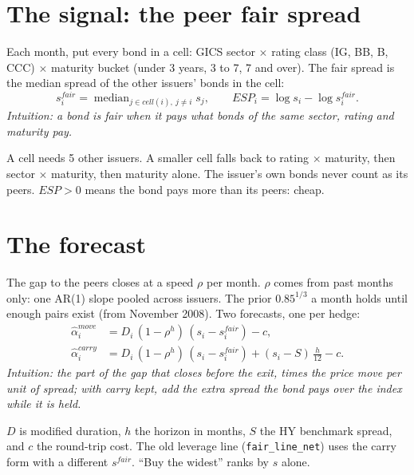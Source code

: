 \documentclass[11pt,a4paper]{article}
\newcommand{\code}[1]{\texttt{\small #1}}
\begin{document}
\section{The signal: the peer fair spread}
Each month, put every bond in a cell: GICS sector $\times$ rating class (IG, BB, B, CCC) $\times$ maturity bucket (under 3 years, 3 to 7, 7 and over). The fair spread is the median spread of the other issuers' bonds in the cell:
\begin{equation}
s^{fair}_i = \operatorname{median}_{j \in cell(i),\ j \ne i} s_j, \qquad ESP_i = \log s_i - \log s^{fair}_i .
\end{equation}
\textit{Intuition: a bond is fair when it pays what bonds of the same sector, rating and maturity pay.}

A cell needs 5 other issuers. A smaller cell falls back to rating $\times$ maturity, then sector $\times$ maturity, then maturity alone. The issuer's own bonds never count as its peers. $ESP > 0$ means the bond pays more than its peers: cheap.

\section{The forecast}
The gap to the peers closes at a speed $\rho$ per month. $\rho$ comes from past months only: one AR(1) slope pooled across issuers. The prior $0.85^{1/3}$ a month holds until enough pairs exist (from November 2008). Two forecasts, one per hedge:
\begin{align}
\hat\alpha^{move}_i &= D_i\,(1-\rho^{h})\,(s_i - s^{fair}_i) - c, \\
\hat\alpha^{carry}_i &= D_i\,(1-\rho^{h})\,(s_i - s^{fair}_i) + (s_i - S)\,\tfrac{h}{12} - c .
\end{align}
\textit{Intuition: the part of the gap that closes before the exit, times the price move per unit of spread; with carry kept, add the extra spread the bond pays over the index while it is held.}

\noindent $D$ is modified duration, $h$ the horizon in months, $S$ the HY benchmark spread, and $c$ the round-trip cost. The old leverage line (\code{fair\_line\_net}) uses the carry form with a different $s^{fair}$. ``Buy the widest'' ranks by $s$ alone.
\end{document}
